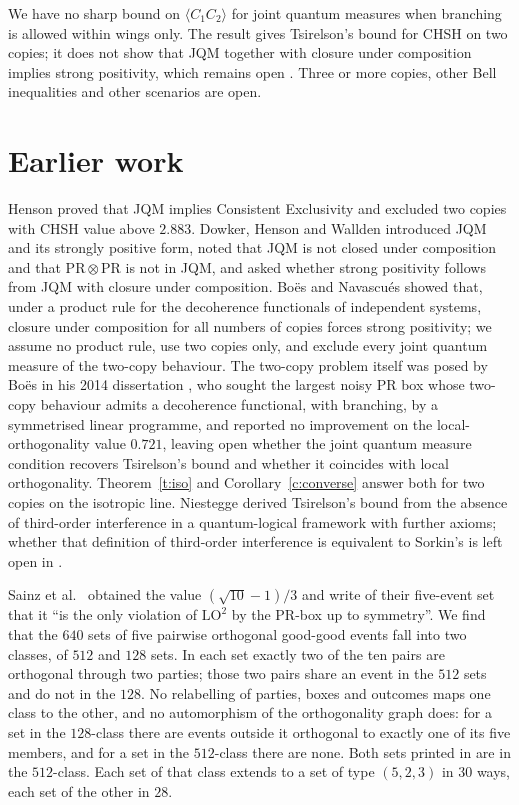 \documentclass[11pt,a4paper]{article}
\theoremstyle{definition}
\theoremstyle{remark}
\newcommand{\PR}{\mathrm{PR}}
\begin{document}
We have no sharp bound on $\langle C_1C_2\rangle$ for joint quantum measures when branching is allowed
within wings only. The result gives Tsirelson's bound for CHSH on two copies; it does not show that JQM
together with closure under composition implies strong positivity, which remains open \cite{DHW}. Three
or more copies, other Bell inequalities and other scenarios are open.

\section{Earlier work}\label{s:earlier}

Henson \cite{Henson} proved that JQM implies Consistent Exclusivity and excluded two copies with CHSH
value above $2.883$. Dowker, Henson and Wallden \cite{DHW} introduced JQM and its strongly positive
form, noted that JQM is not closed under composition and that $\PR\otimes\PR$ is not in JQM, and asked
whether strong positivity follows from JQM with closure under composition. Bo\"es and Navascu\'es
\cite{BN} showed that, under a product rule for the decoherence functionals of independent systems,
closure under composition for all numbers of copies forces strong positivity; we assume no product rule,
use two copies only, and exclude every joint quantum measure of the two-copy behaviour. The two-copy
problem itself was posed by Bo\"es in his 2014 dissertation \cite[Section~6.3]{Boes}, who sought the
largest noisy PR box whose two-copy behaviour admits a decoherence functional, with branching, by a
symmetrised linear programme, and reported no improvement on the local-orthogonality value $0.721$,
leaving open whether the joint quantum measure condition recovers Tsirelson's bound and whether it
coincides with local orthogonality. Theorem~\ref{t:iso} and Corollary~\ref{c:converse} answer both for
two copies on the isotropic line. Niestegge
\cite{Niestegge} derived Tsirelson's bound from the absence of third-order interference in a
quantum-logical framework with further axioms; whether that definition of third-order interference is
equivalent to Sorkin's is left open in \cite{Henson}.

Sainz et al.\ \cite{Sainz} obtained the value $(\sqrt{10}-1)/3$ and write of their five-event set that
it ``is the only violation of $\mathrm{LO}^2$ by the PR-box up to symmetry''. We find that the $640$
sets of five pairwise orthogonal good-good events fall into two classes, of $512$ and $128$ sets. In
each set exactly two of the ten pairs are orthogonal through two parties; those two pairs share an
event in the $512$ sets and do not in the $128$. No relabelling of parties, boxes and outcomes maps one
class to the other, and no automorphism of the orthogonality graph does: for a set in the $128$-class
there are events outside it orthogonal to exactly one of its five members, and for a set in the
$512$-class there are none. Both sets printed in \cite{Sainz} are in the $512$-class. Each set of that
class extends to a set of type $(5,2,3)$ in $30$ ways, each set of the other in $28$.
\end{document}
